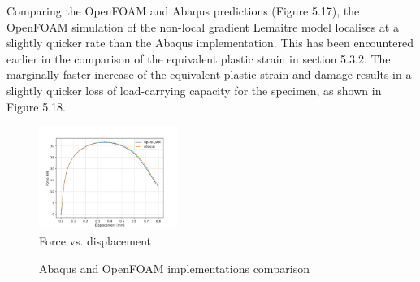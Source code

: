 \documentclass[sn-mathphys,Numbered,draft]{sn-jnl}%
\begin{document}

Comparing the OpenFOAM and Abaqus predictions (Figure 5.17), the OpenFOAM simulation of the non-local gradient Lemaitre model localises at a slightly quicker rate than the Abaqus implementation. This has been encountered earlier in the comparison of the equivalent plastic strain in section 5.3.2. The marginally faster increase of the equivalent plastic strain and damage results in a slightly quicker loss of load-carrying capacity for the specimen, as shown in Figure 5.18.

\begin{figure}[htb]
\begin{center}
	\includegraphics[width=0.4\textwidth]{./Figures/LemaitreCompare/axiCompare/1.1LemaitreCompare.png}
\caption{Force vs. displacement}
\label{fig:notchedRoundBAr}
\end{center}
\end{figure}

\begin{figure}[htbp]
	\centering
		
		\caption{Abaqus and OpenFOAM implementations comparison}
	\label{label_for_entire_figure}
\end{figure}
\FloatBarrier
\end{document}
